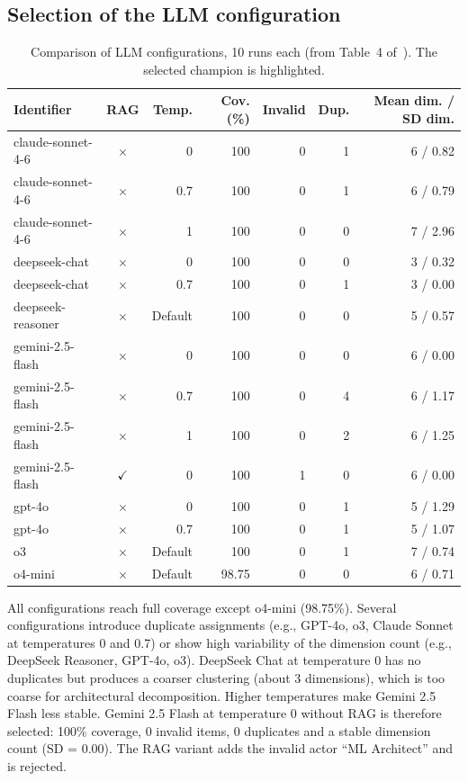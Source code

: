 \documentclass[11pt,a4paper]{article}
\begin{document}
\subsection{Selection of the LLM configuration}

\begin{table}[h]
\centering
\caption{Comparison of LLM configurations, 10 runs each (from Table~4 of~\cite{daoud2026}). The selected champion is highlighted.}\label{tab:llmresults}
\small
\begin{tabular}{@{}lcrrrrr@{}}
\toprule
Identifier & RAG & Temp. & Cov. (\%) & Invalid & Dup. & Mean dim. / SD dim. \\
\midrule
claude-sonnet-4-6 & $\times$ & 0 & 100 & 0 & 1 & 6 / 0.82 \\
claude-sonnet-4-6 & $\times$ & 0.7 & 100 & 0 & 1 & 6 / 0.79 \\
claude-sonnet-4-6 & $\times$ & 1 & 100 & 0 & 0 & 7 / 2.96 \\
deepseek-chat & $\times$ & 0 & 100 & 0 & 0 & 3 / 0.32 \\
deepseek-chat & $\times$ & 0.7 & 100 & 0 & 1 & 3 / 0.00 \\
deepseek-reasoner & $\times$ & Default & 100 & 0 & 0 & 5 / 0.57 \\
\rowcolor{gray!25}
gemini-2.5-flash & $\times$ & 0 & 100 & 0 & 0 & 6 / 0.00 \\
gemini-2.5-flash & $\times$ & 0.7 & 100 & 0 & 4 & 6 / 1.17 \\
gemini-2.5-flash & $\times$ & 1 & 100 & 0 & 2 & 6 / 1.25 \\
gemini-2.5-flash & $\checkmark$ & 0 & 100 & 1 & 0 & 6 / 0.00 \\
gpt-4o & $\times$ & 0 & 100 & 0 & 1 & 5 / 1.29 \\
gpt-4o & $\times$ & 0.7 & 100 & 0 & 1 & 5 / 1.07 \\
o3 & $\times$ & Default & 100 & 0 & 1 & 7 / 0.74 \\
o4-mini & $\times$ & Default & 98.75 & 0 & 0 & 6 / 0.71 \\
\bottomrule
\end{tabular}
\end{table}

All configurations reach full coverage except o4-mini (98.75\%). Several configurations introduce duplicate assignments (e.g., GPT-4o, o3, Claude Sonnet at temperatures 0 and 0.7) or show high variability of the dimension count (e.g., DeepSeek Reasoner, GPT-4o, o3). DeepSeek Chat at temperature 0 has no duplicates but produces a coarser clustering (about 3 dimensions), which is too coarse for architectural decomposition. Higher temperatures make Gemini 2.5 Flash less stable. Gemini 2.5 Flash at temperature 0 without RAG is therefore selected: 100\% coverage, 0 invalid items, 0 duplicates and a stable dimension count (SD = 0.00). The RAG variant adds the invalid actor ``ML Architect'' and is rejected.
\end{document}

